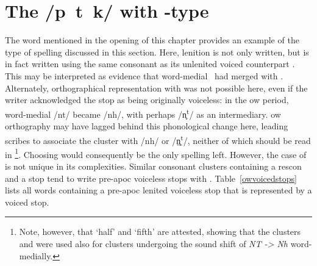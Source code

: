 \section{The /p~t~k/ with -type}
\label{ptkwithbdg}
The word  mentioned in the opening of this chapter provides an example of the type of spelling discussed in this section. Here, lenition is not only written, but is in fact written using the same consonant as its unlenited voiced counterpart . This may be interpreted as evidence that word-medial \lT\ had merged with \xD.  Alternately, orthographical representation with  was not possible here, even if the writer acknowledged the stop as being originally voiceless: in the \gls{ow} period, word-medial /nt/ became /nh/, with perhaps /n̥\textsuperscript{t}/ as an intermediary. \Gls{ow} orthography may have lagged behind this phonological change here, leading scribes to associate the cluster  with /nh/ or /n̥̤\textsuperscript{t}/, neither of which should be read in \footnote{Note, however, that  `half' and  `fifth' are attested, showing that the clusters  and  were used also for clusters undergoing the sound shift of \textit{NT -> Nh} word-medially.}. Choosing  would consequently be the only spelling left. However, the case of  is not unique in its complexities. Similar consonant clusters containing a \gls{rescon} and a stop tend to write pre-\gls{apoc} voiceless stops with . Table~\ref{owvoicedstops} lists all words containing a pre-\gls{apoc} lenited voiceless stop that is represented by a voiced stop.

